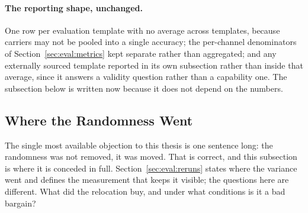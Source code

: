 \paragraph{The reporting shape, unchanged.}
One row per evaluation template with no average across templates, because carriers may not be
pooled into a single accuracy; the per-channel denominators of Section~\ref{sec:eval:metrics}
kept separate rather than aggregated; and any externally sourced template reported in its own
subsection rather than inside that average, since it answers a validity question rather than a
capability one. The subsection below is written now because it does not depend on the numbers.

%

\subsection{Where the Randomness Went}
\label{sec:eval:randomness}


The single most available objection to this thesis is one sentence long: the randomness was not
removed, it was moved. That is correct, and this subsection is where it is conceded in full.
Section~\ref{sec:eval:reruns} states where the variance went and defines the measurement that
keeps it visible; the questions here are different. What did the relocation buy, and under what
conditions is it a bad bargain?

